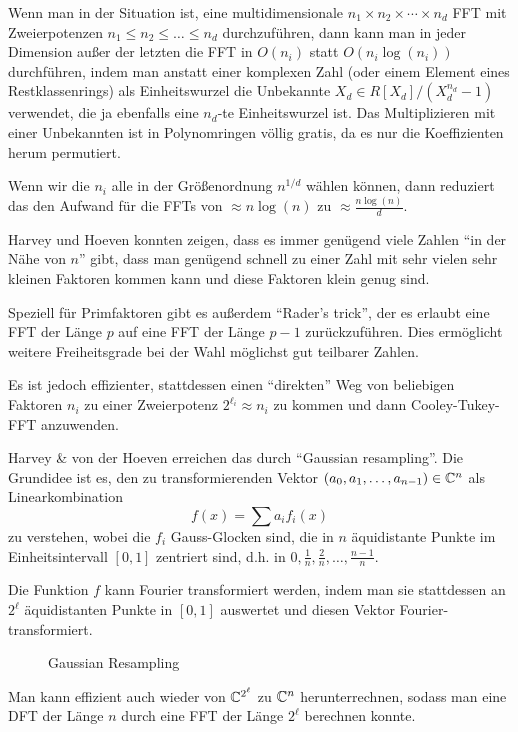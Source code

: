 \begin{remark}
    Wenn man in der Situation ist, eine multidimensionale $n_1\times n_2\times \cdots\times n_d$ FFT mit Zweierpotenzen $n_1\leq n_2\leq \ldots\leq n_d$ durchzuführen, dann kann man in jeder Dimension außer der letzten die FFT in $O(n_i)$ statt $O(n_i \log(n_i))$ durchführen, indem man anstatt einer komplexen Zahl (oder einem Element eines Restklassenrings) als Einheitswurzel die Unbekannte $X_d \in R[X_d]/(X_d^{n_d}-1)$ verwendet, die ja ebenfalls eine $n_d$-te Einheitswurzel ist. Das Multiplizieren mit einer Unbekannten ist in Polynomringen völlig gratis, da es nur die Koeffizienten herum permutiert.

    Wenn wir die $n_i$ alle in der Größenordnung $n^{1/d}$ wählen können, dann reduziert das den Aufwand für die FFTs von $\approx n\log(n)$ zu $\approx \frac{n\log(n)}{d}$.
\end{remark}

\begin{remark}
    Harvey und Hoeven konnten zeigen, dass es immer genügend viele Zahlen \enquote{in der Nähe von $n$} gibt, dass man genügend schnell zu einer Zahl mit sehr vielen sehr kleinen Faktoren kommen kann und diese Faktoren klein genug sind.
\end{remark}

\begin{remark}
    Speziell für Primfaktoren gibt es außerdem \enquote{Rader's trick}, der es erlaubt eine FFT der Länge $p$ auf eine FFT der Länge $p-1$ zurückzuführen. Dies ermöglicht weitere Freiheitsgrade bei der Wahl möglichst gut teilbarer Zahlen.

    \medskip
    Es ist jedoch effizienter, stattdessen einen \enquote{direkten} Weg von beliebigen Faktoren $n_i$ zu einer Zweierpotenz $2^{\ell_i} \approx n_i$ zu kommen und dann Cooley-Tukey-FFT anzuwenden.

    Harvey \& von der Hoeven erreichen das durch \enquote{Gaussian resampling}. Die Grundidee ist es, den zu transformierenden Vektor $(a_0,a_1,\ldots,a_{n-1})\in\mathbb{C}^n$ als Linearkombination
    \[f(x) = \sum a_i f_i(x)\]
    zu verstehen, wobei die $f_i$ Gauss-Glocken sind, die in $n$ äquidistante Punkte im Einheitsintervall $[0,1]$ zentriert sind, d.h. in $0,\frac{1}{n},\frac{2}{n},\ldots,\frac{n-1}{n}$.

    Die Funktion $f$ kann Fourier transformiert werden, indem man sie stattdessen an $2^{\ell}$ äquidistanten Punkte in $[0,1]$ auswertet und diesen Vektor Fourier-transformiert.
    \begin{figure}[htp]
        \caption{Gaussian Resampling}
        \label{fig:gaussian_resampling}
    \end{figure}
    Man kann effizient auch wieder von $\mathbb{C}^{2^\ell}$ zu $\mathbb{C}^n$ herunterrechnen, sodass man eine DFT der Länge $n$ durch eine FFT der Länge $2^\ell$ berechnen konnte.
\end{remark}

